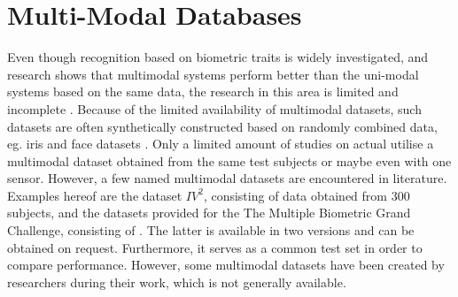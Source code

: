 \section{Multi-Modal Databases}
Even though recognition based on biometric traits is widely investigated, and research shows that multimodal systems perform better than the uni-modal systems based on the same data, the research in this area is limited and incomplete \citep{Chen2005a,Bowyer2016b}. Because of the limited availability of multimodal datasets, such datasets are often synthetically constructed based on randomly combined data, eg. iris and face datasets \citep{Chen2005a}. Only a limited amount of studies on actual utilise a multimodal dataset obtained from the same test subjects or maybe even with one sensor. However, a few named multimodal datasets are encountered in literature. Examples hereof are the dataset $IV^2$, consisting of data obtained from 300 subjects, and the datasets provided for the The Multiple Biometric Grand Challenge, consisting of \citep{Petrovska-Delacretaz2008a,Bowyer2016b}. The latter is available in two versions and can be obtained on request. Furthermore, it serves as a common test set in order to compare performance. However, some multimodal datasets have been created by researchers during their work, which is not generally available. 

